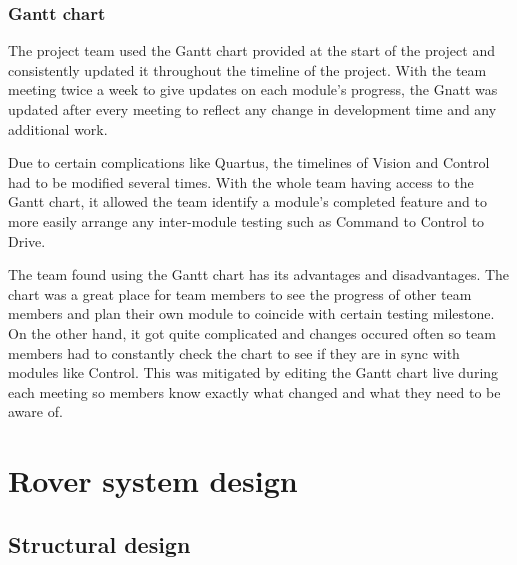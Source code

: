 \documentclass[11pt, a4paper]{article}
\begin{document}
\vfill
\pagebreak

\subsubsection{Gantt chart}

The project team used the Gantt chart provided at the start of the project and consistently updated it throughout the timeline of the project. With the team meeting twice a week to give updates on each module's progress, the Gnatt was updated after every meeting to reflect any change in development time and any additional work. 

Due to certain complications like Quartus, the timelines of Vision and Control had to be modified several times. With the whole team having access to the Gantt chart, it allowed the team identify a module's completed feature and to more easily arrange any inter-module testing such as Command to Control to Drive.  

The team found using the Gantt chart has its advantages and disadvantages. The chart was a great place for team members to see the progress of other team members and plan their own module to coincide with certain testing milestone. On the other hand, it got quite complicated and changes occured often so team members had to constantly check the chart to see if they are in sync with modules like Control. This was mitigated by editing the Gantt chart live during each meeting so members know exactly what changed and what they need to be aware of.






\vfill






\pagebreak
\section{Rover system design}

\subsection{Structural design}
\end{document}
